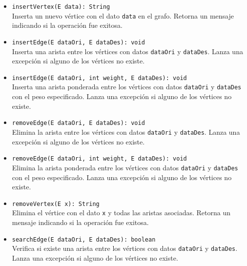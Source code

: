 \documentclass{article}
\begin{document}
                \begin{itemize}
                    \item \texttt{insertVertex(E data): String}\\
                    Inserta un nuevo vértice con el dato \texttt{data} en el grafo. Retorna un mensaje indicando si la operación fue exitosa.
                    
                    \item \texttt{insertEdge(E dataOri, E dataDes): void}\\
                    Inserta una arista entre los vértices con datos \texttt{dataOri} y \texttt{dataDes}. Lanza una excepción si alguno de los vértices no existe.
                    
                    \item \texttt{insertEdge(E dataOri, int weight, E dataDes): void}\\
                    Inserta una arista ponderada entre los vértices con datos \texttt{dataOri} y \texttt{dataDes} con el peso especificado. Lanza una excepción si alguno de los vértices no existe.
                    
                    \item \texttt{removeEdge(E dataOri, E dataDes): void}\\
                    Elimina la arista entre los vértices con datos \texttt{dataOri} y \texttt{dataDes}. Lanza una excepción si alguno de los vértices no existe.
                    
                    \item \texttt{removeEdge(E dataOri, int weight, E dataDes): void}\\
                    Elimina la arista ponderada entre los vértices con datos \texttt{dataOri} y \texttt{dataDes} con el peso especificado. Lanza una excepción si alguno de los vértices no existe.
                    
                    \item \texttt{removeVertex(E x): String}\\
                    Elimina el vértice con el dato \texttt{x} y todas las aristas asociadas. Retorna un mensaje indicando si la operación fue exitosa.
                    
                    \item \texttt{searchEdge(E dataOri, E dataDes): boolean}\\
                    Verifica si existe una arista entre los vértices con datos \texttt{dataOri} y \texttt{dataDes}. Lanza una excepción si alguno de los vértices no existe.
                    

\end{itemize}
\end{document}
